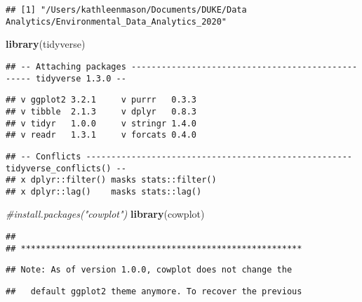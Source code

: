 \documentclass[]{article}
\newenvironment{Shaded}{\begin{snugshade}}{\end{snugshade}}
\newcommand{\CommentTok}[1]{\textcolor[rgb]{0.56,0.35,0.01}{\textit{#1}}}
\newcommand{\KeywordTok}[1]{\textcolor[rgb]{0.13,0.29,0.53}{\textbf{#1}}}
\newcommand{\NormalTok}[1]{#1}
\begin{document}
\begin{Shaded}
\end{Shaded}

\begin{verbatim}
## [1] "/Users/kathleenmason/Documents/DUKE/Data Analytics/Environmental_Data_Analytics_2020"
\end{verbatim}

\begin{Shaded}
\begin{Highlighting}[]
\KeywordTok{library}\NormalTok{(tidyverse)}
\end{Highlighting}
\end{Shaded}

\begin{verbatim}
## -- Attaching packages -------------------------------------------------- tidyverse 1.3.0 --
\end{verbatim}

\begin{verbatim}
## v ggplot2 3.2.1     v purrr   0.3.3
## v tibble  2.1.3     v dplyr   0.8.3
## v tidyr   1.0.0     v stringr 1.4.0
## v readr   1.3.1     v forcats 0.4.0
\end{verbatim}

\begin{verbatim}
## -- Conflicts ----------------------------------------------------- tidyverse_conflicts() --
## x dplyr::filter() masks stats::filter()
## x dplyr::lag()    masks stats::lag()
\end{verbatim}

\begin{Shaded}
\begin{Highlighting}[]
\CommentTok{#install.packages("cowplot")}
\KeywordTok{library}\NormalTok{(cowplot)}
\end{Highlighting}
\end{Shaded}

\begin{verbatim}
## 
## ********************************************************
\end{verbatim}

\begin{verbatim}
## Note: As of version 1.0.0, cowplot does not change the
\end{verbatim}

\begin{verbatim}
##   default ggplot2 theme anymore. To recover the previous
\end{verbatim}
\end{document}
